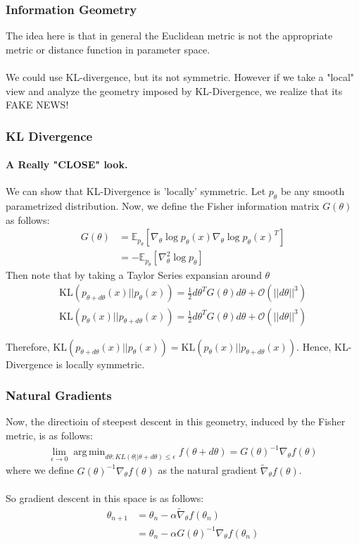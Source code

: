 \documentclass[hyperref={pdfpagelabels=false}]{beamer}
\DeclareMathOperator*{\argmin}{arg\,min}
\begin{document}
\begin{frame}
\frametitle{Information Geometry}

The idea here is that in general the Euclidean metric is not the appropriate metric or distance function in parameter space.  \\
\
\\
We could use KL-divergence, but its not symmetric. However if we take a "local" view and analyze the geometry imposed by KL-Divergence, we realize that its  FAKE NEWS!
\end{frame}

\begin{frame}
\frametitle{KL Divergence}
\framesubtitle{A Really "CLOSE" look.}
We can show that KL-Divergence is 'locally' symmetric. Let $p_{\theta}$ be any smooth parametrized distribution. Now, we define the Fisher information matrix $G(\theta)$ as follows:
\begin{align*}
G(\theta) &= \mathbb{E}_{p_{\theta}}[\nabla_{\theta} \log p_{\theta}(x) \nabla_{\theta} \log p_{\theta}(x)^T] \\
&= -\mathbb{E}_{p_{\theta}}[\nabla^{2}_{\theta} \log p_{\theta}]
\end{align*}
Then note that by taking a Taylor Series expansian around $\theta$
\begin{align*}
\text{KL}(p_{\theta + d\theta}(x) || p_{\theta}(x)) = \frac{1}{2} d\theta^T G(\theta) d\theta + \mathcal{O}(||d\theta||^3) \\
\text{KL}(p_{\theta}(x) || p_{\theta + d\theta}(x)) = \frac{1}{2} d\theta^T G(\theta) d\theta + \mathcal{O}(||d\theta||^3)
\end{align*}

Therefore, $\text{KL}(p_{\theta + d\theta}(x) || p_{\theta}(x)) = \text{KL}(p_{\theta}(x) || p_{\theta + d\theta}(x))$. Hence, KL-Divergence is locally symmetric.
\end{frame}

\begin{frame}
\frametitle{Natural Gradients}
Now, the directioin of steepest descent in this geometry, induced by the Fisher metric, is as follows:
\begin{align*}
\lim_{\epsilon \rightarrow 0} \argmin_{d\theta: KL(\theta || \theta + d\theta) \leq \epsilon } f( \theta + d\theta) = G(\theta)^{-1} \nabla_{\theta} f(\theta)
\end{align*}
where we define $G(\theta)^{-1} \nabla_{\theta} f(\theta)$ as the natural gradient $\tilde{\nabla}_{\theta} f(\theta)$. \\
\
\\
 So gradient descent in this space is as follows:
\begin{align*}
\theta_{n+1} &= \theta_{n} - \alpha \tilde{\nabla}_{\theta} f(\theta_n) \\
&= \theta_{n} - \alpha G(\theta)^{-1} \nabla_{\theta} f(\theta_n)
\end{align*}
\end{frame}
\end{document}
